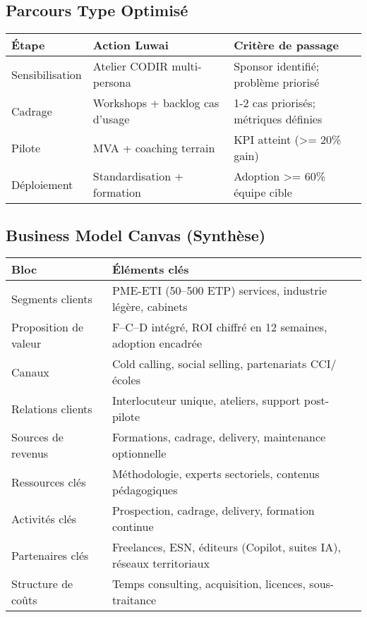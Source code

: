 \subsection{Parcours Type Optimisé}
\begin{longtable}{@{}p{3cm}p{5cm}p{6cm}@{}}
\toprule
\textbf{Étape} & \textbf{Action Luwai} & \textbf{Critère de passage} \\
\midrule
Sensibilisation & Atelier CODIR multi-persona & Sponsor identifié; problème priorisé \\
Cadrage & Workshops + backlog cas d'usage & 1-2 cas priorisés; métriques définies \\
Pilote & MVA + coaching terrain & KPI atteint (\textgreater{}= 20\% gain) \\
Déploiement & Standardisation + formation & Adoption \textgreater{}= 60\% équipe cible \\
\bottomrule
\end{longtable}

\subsection{Business Model Canvas (Synthèse)}
\begin{longtable}{@{}p{4.2cm}p{10.8cm}@{}}
\toprule
\textbf{Bloc} & \textbf{Éléments clés} \\
\midrule
Segments clients & PME-ETI (50–500 ETP) services, industrie légère, cabinets \\
Proposition de valeur & F–C–D intégré, ROI chiffré en 12 semaines, adoption encadrée \\
Canaux & Cold calling, social selling, partenariats CCI/écoles \\
Relations clients & Interlocuteur unique, ateliers, support post-pilote \\
Sources de revenus & Formations, cadrage, delivery, maintenance optionnelle \\
Ressources clés & Méthodologie, experts sectoriels, contenus pédagogiques \\
Activités clés & Prospection, cadrage, delivery, formation continue \\
Partenaires clés & Freelances, ESN, éditeurs (Copilot, suites IA), réseaux territoriaux \\
Structure de coûts & Temps consulting, acquisition, licences, sous-traitance \\
\bottomrule
\end{longtable}

